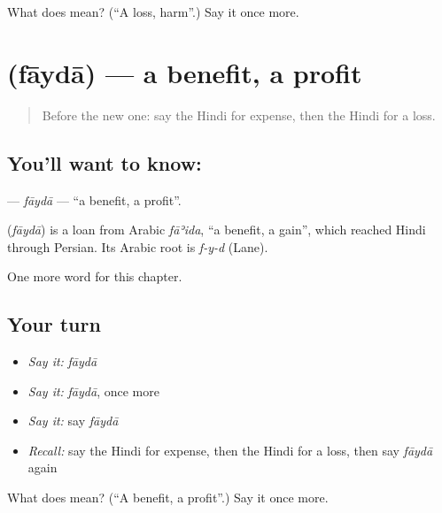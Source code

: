 \begin{tcolorbox}[breakable,colback=teal!4,colframe=teal!35!black,title={Before you move on}]
What does  mean? (\textquotedblleft{}A loss, harm\textquotedblright{}.) Say it once more.
\end{tcolorbox}
\section[\texorpdfstring{\hi{फ़ायदा} (fāydā)}{फ़ायदा (fāydā)}]{ (fāydā) — a benefit, a profit}

\label{lesson:HI-C208-fayda}



\begin{quote}
Before the new one: say the Hindi for expense, then the Hindi for a loss.
\end{quote}

\subsection*{You'll want to know: }
\textbf{} — \emph{fāydā} — \textquotedblleft{}a benefit, a profit\textquotedblright{}.

\begin{cousinweb}
\textbf{} (\emph{fāydā}) is a loan from Arabic \emph{fāʾida}, \textquotedblleft{}a benefit, a gain\textquotedblright{}, which reached Hindi through Persian. Its Arabic root is \emph{f-y-d} (Lane).
\end{cousinweb}

\begin{grammarlens}[title={What you've built}]
One more word for this chapter.
\end{grammarlens}

\subsection*{Your turn}
\begin{itemize}
\raggedright
  \item \emph{Say it:} \emph{fāydā}
  \item \emph{Say it:} \emph{fāydā}, once more
  \item \emph{Say it:} say \emph{fāydā}
  \item \emph{Recall:} say the Hindi for expense, then the Hindi for a loss, then say \emph{fāydā} again
\end{itemize}

\begin{tcolorbox}[breakable,colback=teal!4,colframe=teal!35!black,title={Before you move on}]
What does  mean? (\textquotedblleft{}A benefit, a profit\textquotedblright{}.) Say it once more.
\end{tcolorbox}
